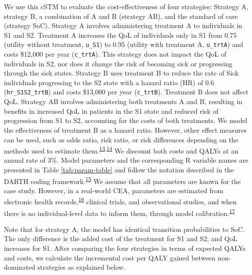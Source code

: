 \documentclass[
]{article}
\begin{document}
We use this cSTM to evaluate the cost-effectiveness of four strategies: Strategy A, strategy B, a combination of A and B (strategy AB), and the standard of care (strategy SoC). Strategy A involves administering treatment A to individuals in S1 and S2. Treatment A increases the QoL of individuals only in S1 from 0.75 (utility without treatment, \texttt{u\_S1}) to 0.95 (utility with treatment A, \texttt{u\_trtA}) and costs \$12,000 per year (\texttt{c\_trtA}). This strategy does not impact the QoL of individuals in S2, nor does it change the risk of becoming sick or progressing through the sick states. Strategy B uses treatment B to reduce the rate of Sick individuals progressing to the S2 state with a hazard ratio (HR) of 0.6 (\texttt{hr\_S1S2\_trtB}) and costs \$13,000 per year (\texttt{c\_trtB}). Treatment B does not affect QoL. Strategy AB involves administering both treatments A and B, resulting in benefits in increased QoL in patients in the S1 state and reduced risk of progression from S1 to S2, accounting for the costs of both treatments. We model the effectiveness of treatment B as a hazard ratio. However, other effect measures can be used, such as odds ratio, risk ratio, or risk differences depending on the methods used to estimate them.\textsuperscript{\protect\hyperlink{ref-Kuntz2001}{13},\protect\hyperlink{ref-Ades2004a}{14}} We discount both costs and QALYs at an annual rate of 3\%. Model parameters and the corresponding R variable names are presented in Table \ref{tab:param-table} and follow the notation described in the DARTH coding framework.\textsuperscript{\protect\hyperlink{ref-Alarid-Escudero2019e}{15}} We assume that all parameters are known for the case study. However, in a real-world CEA, parameters are estimated from electronic health records,\textsuperscript{\protect\hyperlink{ref-Rodriguez2021}{16}} clinical trials, and observational studies, and when there is no individual-level data to inform them, through model calibration.\textsuperscript{\protect\hyperlink{ref-Welton2005}{17}}

Note that for strategy A, the model has identical transition probabilities to SoC. The only difference is the added cost of the treatment for S1 and S2, and QoL increases for S1. After comparing the four strategies in terms of expected QALYs and costs, we calculate the incremental cost per QALY gained between non-dominated strategies as explained below.
\end{document}
